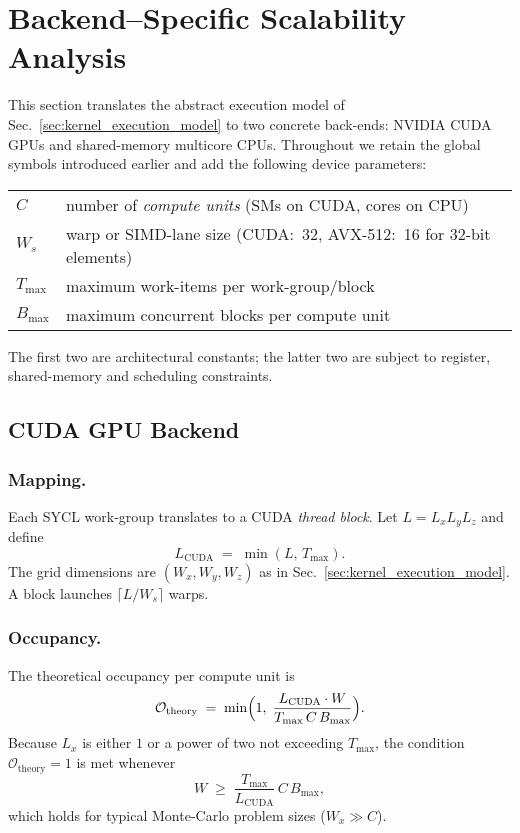 \chapter{Backend–Specific Scalability Analysis}
\label{sec:backend_scaling}

This section translates the abstract execution model of
Sec.~\ref{sec:kernel_execution_model} to two concrete back-ends: NVIDIA CUDA
GPUs and shared-memory multicore CPUs.  Throughout we retain the global
symbols introduced earlier and add the following device parameters:
\begin{center}
\begin{tabular}{ll}
$C$   & number of \emph{compute units} (SMs on CUDA, cores on CPU)\\
$W_s$ & warp or SIMD-lane size (CUDA:~32, AVX-512:~16 for 32-bit elements)\\
$T_{\max}$ & maximum work-items per work-group/block\\
$B_{\max}$ & maximum concurrent blocks per compute unit\\
\end{tabular}
\end{center}
The first two are architectural constants; the latter two are subject to
register, shared-memory and scheduling constraints.

\section{CUDA GPU Backend}
\label{subsec:cuda_backend}

\subsection{Mapping.}  Each SYCL work-group translates to a CUDA \emph{thread
block}.  Let $L=L_xL_yL_z$ and define
\[
  L_\text{CUDA} \;=\; \min(L,\,T_{\max}).
\]
The grid dimensions are $(W_x,W_y,W_z)$ as in
Sec.~\ref{sec:kernel_execution_model}.  A block launches $\lceil L/W_s\rceil$
warps.

\subsection{Occupancy.}  The theoretical occupancy per compute unit is
\[
  \mathcal{O}_\text{theory} \;=\; \min\Bigl(1,\;\frac{L_\text{CUDA}
                                         \cdot W}{T_{\max}\,C\,B_{\max}}\Bigr).
\]
Because $L_x$ is either $1$ or a power of two not exceeding
$T_{\max}$, the condition $\mathcal{O}_\text{theory}=1$ is met whenever
\[
  W \;\ge\; \frac{T_{\max}}{L_\text{CUDA}}\,C\,B_{\max},
\]
which holds for typical Monte-Carlo problem sizes ($W_x\gg C$).

